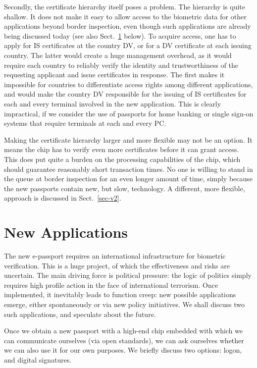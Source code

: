 \documentclass[runningheads,envcountsame,envcountsect,oribibl]{llncs}
\begin{document}
Secondly, the certificate hierarchy itself poses a problem.
The hierarchy is quite shallow.
It does not
make it easy to allow access to the biometric data for other
applications beyond border inspection, even though such applications are
already being discussed today (see also Sect.~\ref{sec-newapps} below).
To acquire access, one has to apply for IS certificates at the country
DV, or for a DV certificate at each issuing country. The latter would create a
huge management overhead, as it would require each country to reliably verify
the identity and trustworthiness of the requesting applicant and issue
certificates in response. The first makes it impossible for countries to
differentiate access rights among different applications, and would make the
country DV responsible for the issuing of IS certificates for each and every
terminal involved in the new application. This is clearly impractical, if we
consider the use of passports for home banking or single sign-on systems that
require terminals at each and every PC.

Making the certificate hierarchy larger and more flexible may not be an
option. It means the
chip has to verify even more certificates before it can grant access. This
does put quite a burden on the processing capabilities of the chip,
which should guarantee reasonably short transaction times. No one is willing to
stand in the queue at border inspection for an even longer amount of time,
simply because the new passports contain new, but slow, technology.
A different, more flexible, approach is discussed in Sect.~\ref{sec-v2}.


\section{New Applications}
\label{sec-newapps}

The new e-passport requires an international infrastructure for
biometric verification. This is a huge project, of which the
effectiveness and risks are uncertain. The main driving force is
political pressure: the logic of politics simply requires high
profile action in the face of international terrorism.
Once implemented, it inevitably leads to
function creep: new possible applications emerge, either spontaneously
or via new policy initiatives. We shall discuss two such
applications, and speculate about the future.




Once we obtain a new passport with a high-end chip embedded with
which we can communicate ourselves (via open standards), we can
ask ourselves whether we can also use it for our own purposes.
We briefly discuss two options: logon, and digital signatures.
\end{document}
